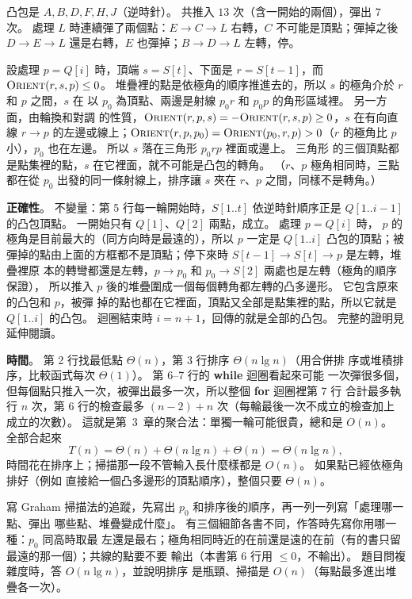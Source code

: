 凸包是 $A, B, D, F, H, J$（逆時針）。 共推入 $13$ 次（含一開始的兩個），彈出 $7$ 次。
處理 $L$ 時連續彈了兩個點：$E \to C \to L$ 右轉，$C$ 不可能是頂點；彈掉之後
$D \to E \to L$ 還是右轉，$E$ 也彈掉；$B \to D \to L$ 左轉，停。

\begin{whybox}[彈掉的點一定不是頂點]
設處理 $p = Q[i]$ 時，頂端 $s = S[t]$、下面是 $r = S[t-1]$，而 $\proc{Orient}(r, s, p)
\le 0$。 堆疊裡的點是依極角的順序推進去的，所以 $s$ 的極角介於 $r$ 和 $p$ 之間，$s$ 在
以 $p_0$ 為頂點、兩邊是射線 $p_0 r$ 和 $p_0 p$ 的角形區域裡。 另一方面，由輪換和對調
的性質，$\proc{Orient}(r, p, s) = -\proc{Orient}(r, s, p) \ge 0$，$s$ 在有向直線
$r \to p$ 的左邊或線上；$\proc{Orient}(r, p, p_0) = \proc{Orient}(p_0, r, p) > 0$（$r$
的極角比 $p$ 小），$p_0$ 也在左邊。 所以 $s$ 落在三角形 $p_0 r p$ 裡面或邊上。 三角形
的三個頂點都是點集裡的點，$s$ 在它裡面，就不可能是凸包的轉角。 （$r$、$p$ 極角相同時，三點都在從
$p_0$ 出發的同一條射線上，排序讓 $s$ 夾在 $r$、$p$ 之間，同樣不是轉角。）
\end{whybox}

\textbf{正確性}。 不變量：第 5 行每一輪開始時，$S[1..t]$ 依逆時針順序正是
$Q[1..i-1]$ 的凸包頂點。 一開始只有 $Q[1]$、$Q[2]$ 兩點，成立。 處理 $p = Q[i]$ 時，
$p$ 的極角是目前最大的（同方向時是最遠的），所以 $p$ 一定是 $Q[1..i]$ 凸包的頂點；被
彈掉的點由上面的方框都不是頂點；停下來時 $S[t-1] \to S[t] \to p$ 是左轉，堆疊裡原
本的轉彎都還是左轉，$p \to p_0$ 和 $p_0 \to S[2]$ 兩處也是左轉（極角的順序保證），
所以推入 $p$ 後的堆疊圍成一個每個轉角都左轉的凸多邊形。 它包含原來的凸包和 $p$，被彈
掉的點也都在它裡面，頂點又全部是點集裡的點，所以它就是 $Q[1..i]$ 的凸包。 迴圈結束時
$i = n + 1$，回傳的就是全部的凸包。 完整的證明見延伸閱讀。

\textbf{時間}。 第 2 行找最低點 $\Theta(n)$，第 3 行排序 $\Theta(n \lg n)$（用合併排
序或堆積排序，比較函式每次 $\Theta(1)$）。 第 6--7 行的 \textbf{while} 迴圈看起來可能
一次彈很多個，但每個點只推入一次，被彈出最多一次，所以整個 \textbf{for} 迴圈裡第 7 行
合計最多執行 $n$ 次，第 6 行的檢查最多 $(n - 2) + n$ 次（每輪最後一次不成立的檢查加上
成立的次數）。 這就是第~3~章的聚合法：單獨一輪可能很貴，總和是 $O(n)$。 全部合起來
\[
T(n) = \Theta(n) + \Theta(n \lg n) + \Theta(n) = \Theta(n \lg n),
\]
時間花在排序上；掃描那一段不管輸入長什麼樣都是 $O(n)$。 如果點已經依極角排好（例如
直接給一個凸多邊形的頂點順序），整個只要 $\Theta(n)$。

\begin{examnote}
寫 Graham 掃描法的追蹤，先寫出 $p_0$ 和排序後的順序，再一列一列寫「處理哪一點、彈出
哪些點、堆疊變成什麼」。 有三個細節各書不同，作答時先寫你用哪一種：$p_0$ 同高時取最
左還是最右；極角相同時近的在前還是遠的在前（有的書只留最遠的那一個）；共線的點要不要
輸出（本書第 6 行用 $\le 0$，不輸出）。 題目問複雜度時，答 $O(n \lg n)$，並說明排序
是瓶頸、掃描是 $O(n)$（每點最多進出堆疊各一次）。
\end{examnote}

